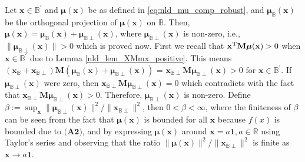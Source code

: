 \documentclass[onecolumn, draft, 12pt]{IEEEtran}
\newcommand{\Cs}{\mathbb{B}}
\newcommand{\Cprime}{\Cs^{'}}
\newcommand{\Ss}{\Cs}
\newcommand{\R}{\mathbb{R}}
\newcommand{\onevect}{\mathbf{1}}
\newcommand{\Pm}{\mathbf{M}}
\newcommand{\Xcp}{\mathbf{x}_{\Cs \perp}}
\newcommand{\mXc}{\mathbf{\boldsymbol\mu}_{\Cs}(\mathbf{x})}
\newcommand{\mXcp}{\mathbf{\boldsymbol\mu}_{\Cs \perp}(\mathbf{x})}
\newcommand{\xX}{\mathbf{x}}
\newcommand{\mx}{\mathbf{\boldsymbol\mu}(\mathbf{x})}
\begin{document}
\begin{IEEEproof}
Let $\xX \in \Cprime$ and $\mx$ be as defined in \eqref{eq:nld_mu_comp_robust}, and $\mXc$ be the orthogonal projection of $\mx$ on $\Ss$. Then, $\mx = \mXc + \mXcp$, where $\mXcp$ is non-zero, i.e., $\| \mXcp\| > 0$ which is proved now. First we recall that $\xX^{\rm T} \Pm \mx >0$ when $\xX \in \Cprime$ due to Lemma \ref{nld_lem_XMmx_positive}. This means $(\xX_{\Ss} + \xX_{\Ss \perp}) \Pm (\mXc + \mXcp)$ = $\xX_{\Ss \perp} \Pm \mXcp >0$ for $\xX \in \Cprime$. If $\mXcp$ were zero, then $\xX_{\Ss \perp} \Pm \mXcp =0$ which contradicts with the fact that $\xX_{\Ss \perp} \Pm \mXcp > 0$. Therefore, $\mXcp$ is non-zero. Define $\beta := \sup_{\xX} \| \mXcp\|^2 / \| \Xcp\|^2 $, then $ 0< \beta < \infty$, where the finiteness of $\beta$ can be seen from the fact that $\mx$ is bounded for all $\xX$ because $f(x)$ is bounded due to $\textbf{(A2)}$, and by expressing $\mx$ around $\xX=a \onevect, a \in \R$ using Taylor's series and observing that the ratio $\| \mx \|^2 / \| \Xcp\|^2$ is finite as $\xX \rightarrow a \onevect$. 


\end{IEEEproof}
\end{document}
